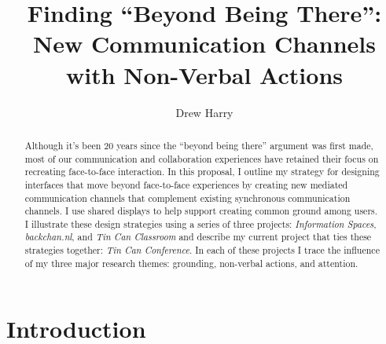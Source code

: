 \documentclass{tufte-handout}
\title{Finding ``Beyond Being There'': New Communication Channels with Non-Verbal Actions}
\author[Drew Harry]{Drew Harry}
\begin{document}
\maketitle%


\begin{abstract}
\noindent Although it's been 20 years since the ``beyond being there'' argument was first made, most of our communication and collaboration experiences have retained their focus on recreating face-to-face interaction. In this proposal, I outline my strategy for designing interfaces that move beyond face-to-face experiences by creating new mediated communication channels that complement existing synchronous communication channels. I use shared displays to help support creating common ground among users. I illustrate these design strategies using a series of three projects: \emph{Information Spaces}, \emph{backchan.nl}, and \emph{Tin Can Classroom} and describe my current project that ties these strategies together: \emph{Tin Can Conference}. In each of these projects I trace the influence of my three major research themes: grounding, non-verbal actions, and attention.
\end{abstract}



\section{Introduction}



\end{document}
